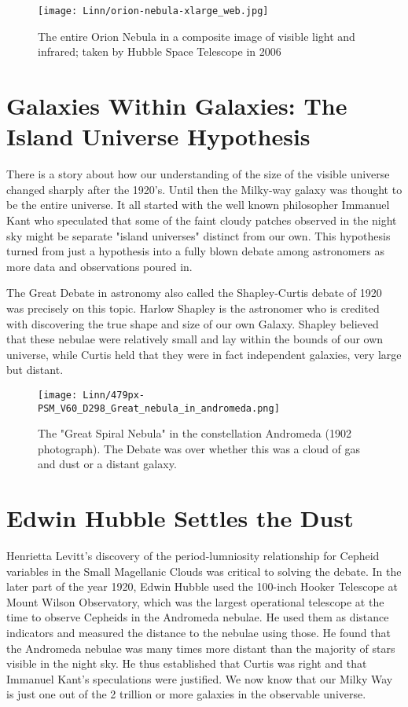 \documentclass{../template/texnote}
\begin{document}
\begin{figure}
     \centering
     \texttt{[image: Linn/orion-nebula-xlarge\_web.jpg]}
     \label{fig:orion}
     \caption{The entire Orion Nebula in a composite image of visible light and infrared; taken by Hubble Space Telescope in 2006}
 \end{figure}
 
 

\section{Galaxies Within Galaxies: The Island Universe Hypothesis}

There is a story about how our understanding of the size of the visible universe changed sharply after the 1920's. Until then the Milky-way galaxy was thought to be the entire universe.  It all started with the well known philosopher Immanuel Kant who speculated  that some of the faint cloudy patches observed in the night sky might be separate "island universes" distinct from our own. This hypothesis turned from just a hypothesis into a fully blown debate among astronomers as more data and observations poured in. 

The Great Debate in astronomy also called the Shapley-Curtis debate of 1920 was precisely on this topic. Harlow Shapley is the astronomer who is credited with discovering the true shape and size of our own Galaxy. Shapley believed that these nebulae were relatively small and lay within the bounds of our own universe, while Curtis held that they were in fact independent galaxies, very large but distant. 

 \begin{figure}
     \centering
     \texttt{[image: Linn/479px-PSM\_V60\_D298\_Great\_nebula\_in\_andromeda.png]}
     \label{fig:spiral}
     \caption{The "Great Spiral Nebula" in the constellation Andromeda (1902 photograph). The Debate was over whether this was a cloud of gas and dust or a distant galaxy.}
 \end{figure}
 
 
 
\section{Edwin Hubble Settles the Dust}

Henrietta Levitt's discovery of the period-lumniosity relationship for Cepheid variables in the Small Magellanic Clouds was critical to solving the debate.  In the later part of the year 1920, Edwin Hubble used the 100-inch Hooker Telescope at Mount Wilson Observatory, which was the largest operational telescope at the time to observe Cepheids in the Andromeda nebulae. He  used them as distance indicators and measured the distance to the nebulae using those. He found that the Andromeda nebulae was many times more distant than the majority of stars visible in the night sky. He thus established that Curtis was right and that Immanuel Kant's speculations were justified. We now know that our Milky Way is just one out of the 2 trillion or more galaxies in the observable universe. 
\end{document}

